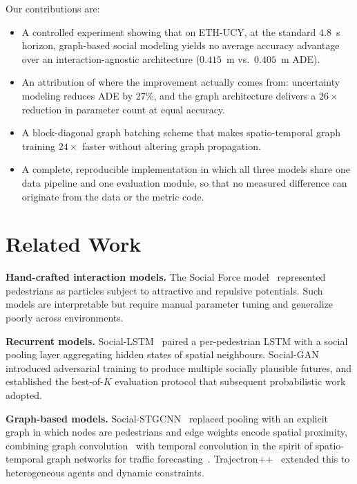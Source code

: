 \documentclass[conference]{IEEEtran}
\begin{document}
Our contributions are:

\begin{itemize}
\item A controlled experiment showing that on ETH-UCY, at the standard $4.8$~s horizon,
      graph-based social modeling yields no average accuracy advantage over an
      interaction-agnostic architecture ($0.415$~m vs.\ $0.405$~m ADE).
\item An attribution of where the improvement actually comes from: uncertainty modeling
      reduces ADE by $27\%$, and the graph architecture delivers a $26\times$ reduction in
      parameter count at equal accuracy.
\item A block-diagonal graph batching scheme that makes spatio-temporal graph training
      $24\times$ faster without altering graph propagation.
\item A complete, reproducible implementation in which all three models share one data
      pipeline and one evaluation module, so that no measured difference can originate
      from the data or the metric code.
\end{itemize}

\section{Related Work}

\textbf{Hand-crafted interaction models.} The Social Force model~\cite{helbing1995social}
represented pedestrians as particles subject to attractive and repulsive potentials. Such
models are interpretable but require manual parameter tuning and generalize poorly across
environments.

\textbf{Recurrent models.} Social-LSTM~\cite{alahi2016social} paired a per-pedestrian LSTM
with a social pooling layer aggregating hidden states of spatial neighbours.
Social-GAN~\cite{gupta2018social} introduced adversarial training to produce multiple
socially plausible futures, and established the best-of-$K$ evaluation protocol that
subsequent probabilistic work adopted.

\textbf{Graph-based models.} Social-STGCNN~\cite{mohamed2020social} replaced pooling with
an explicit graph in which nodes are pedestrians and edge weights encode spatial
proximity, combining graph convolution~\cite{kipf2017semi} with temporal convolution in
the spirit of spatio-temporal graph networks for traffic
forecasting~\cite{yu2018spatio}. Trajectron++~\cite{salzmann2020trajectron} extended this
to heterogeneous agents and dynamic constraints.
\end{document}
